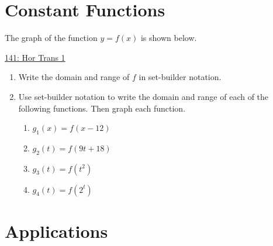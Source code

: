 \documentclass{ximera}
\begin{document}
\section{Constant Functions}
\begin{question} \label{Q9f8fmer}

The graph of the function $y=f(x)$ is shown below.

\begin{onlineOnly}
    \begin{center}
\end{center}
\end{onlineOnly}

\href{https://www.desmos.com/calculator/401gwb7ubc}{141: Hor Trans 1}

\begin{enumerate}

\item Write the domain and range of $f$ in set-builder notation.

\item Use set-builder notation to write the domain and range of each of the following functions. Then graph each function.

\begin{enumerate}

\item $g_1(x) = f(x-12)$

\item $g_2(t) = f(9t + 18)$

\item $g_3(t) = f(t^2)$

\item $g_4(t) = f(2^t)$
\end{enumerate}

\end{enumerate}
\end{question}


\section{Applications}
\end{document}
